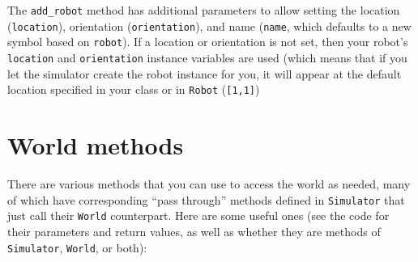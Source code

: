 \documentclass[11pt]{tufte-handout}
\begin{document}
The \texttt{add\_robot} method has additional parameters to allow setting the location (\texttt{location}), orientation (\texttt{orientation}), and name (\texttt{name}, which defaults to a new symbol based on \texttt{robot}).  If a location or orientation is not set, then your robot's \texttt{location} and \texttt{orientation} instance variables are used (which means that if you let the simulator create the robot instance for you, it will appear at the default location specified in your class or in \texttt{Robot} (\texttt{[1,1]})

\section{World methods}
\label{sec:orgbafed9e}

There are various methods that you can use to access the world as needed, many of which have corresponding ``pass through'' methods defined in \texttt{Simulator} that just call their \texttt{World} counterpart.  Here are some useful ones (see the code for their parameters and return values, as well as whether they are methods of  \texttt{Simulator}, \texttt{World}, or both):
\end{document}
